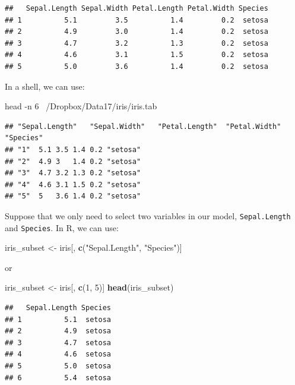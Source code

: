 \documentclass[]{book}
\newenvironment{Shaded}{\begin{snugshade}}{\end{snugshade}}
\newcommand{\KeywordTok}[1]{\textcolor[rgb]{0.13,0.29,0.53}{\textbf{#1}}}
\newcommand{\DecValTok}[1]{\textcolor[rgb]{0.00,0.00,0.81}{#1}}
\newcommand{\StringTok}[1]{\textcolor[rgb]{0.31,0.60,0.02}{#1}}
\newcommand{\FunctionTok}[1]{\textcolor[rgb]{0.00,0.00,0.00}{#1}}
\newcommand{\NormalTok}[1]{#1}
\theoremstyle{definition}
\theoremstyle{definition}
\theoremstyle{definition}
\theoremstyle{remark}
\begin{document}
\begin{verbatim}
##   Sepal.Length Sepal.Width Petal.Length Petal.Width Species
## 1          5.1         3.5          1.4         0.2  setosa
## 2          4.9         3.0          1.4         0.2  setosa
## 3          4.7         3.2          1.3         0.2  setosa
## 4          4.6         3.1          1.5         0.2  setosa
## 5          5.0         3.6          1.4         0.2  setosa
\end{verbatim}

In a shell, we can use:

\begin{Shaded}
\begin{Highlighting}[]
\FunctionTok{head}\NormalTok{ -n 6 ~/Dropbox/Data17/iris/iris.tab}
\end{Highlighting}
\end{Shaded}

\begin{verbatim}
## "Sepal.Length"   "Sepal.Width"   "Petal.Length"  "Petal.Width"   "Species"
## "1"  5.1 3.5 1.4 0.2 "setosa"
## "2"  4.9 3   1.4 0.2 "setosa"
## "3"  4.7 3.2 1.3 0.2 "setosa"
## "4"  4.6 3.1 1.5 0.2 "setosa"
## "5"  5   3.6 1.4 0.2 "setosa"
\end{verbatim}

Suppose that we only need to select two variables in our model,
\texttt{Sepal.Length} and \texttt{Species}. In R, we can use:

\begin{Shaded}
\begin{Highlighting}[]
\NormalTok{iris_subset <-}\StringTok{ }\NormalTok{iris[, }\KeywordTok{c}\NormalTok{(}\StringTok{"Sepal.Length"}\NormalTok{, }\StringTok{"Species"}\NormalTok{)]}
\end{Highlighting}
\end{Shaded}

or

\begin{Shaded}
\begin{Highlighting}[]
\NormalTok{iris_subset <-}\StringTok{ }\NormalTok{iris[, }\KeywordTok{c}\NormalTok{(}\DecValTok{1}\NormalTok{, }\DecValTok{5}\NormalTok{)]}
\KeywordTok{head}\NormalTok{(iris_subset)}
\end{Highlighting}
\end{Shaded}

\begin{verbatim}
##   Sepal.Length Species
## 1          5.1  setosa
## 2          4.9  setosa
## 3          4.7  setosa
## 4          4.6  setosa
## 5          5.0  setosa
## 6          5.4  setosa
\end{verbatim}
\end{document}
